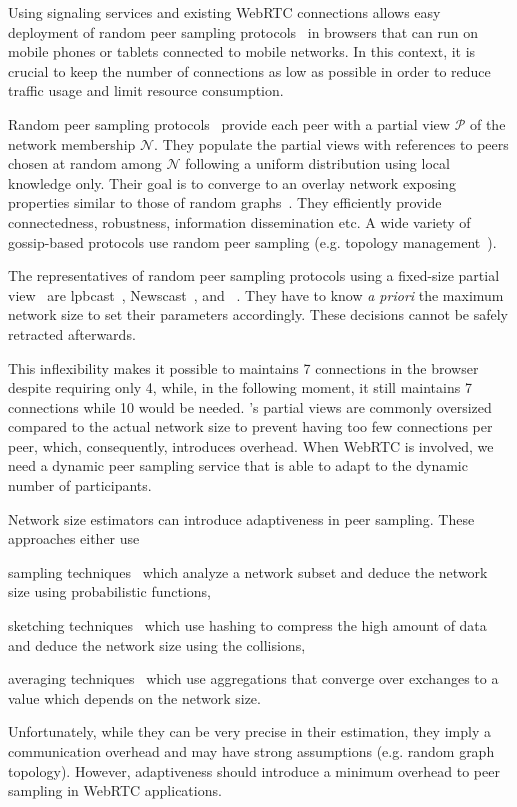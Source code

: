 Using signaling services and existing WebRTC connections allows easy
deployment of random peer sampling protocols~\cite{jelasity2004peer} in
browsers that can run on mobile phones or tablets connected to mobile
networks. In this context, it is crucial to keep the number of connections as
low as possible in order to reduce traffic usage and limit resource
consumption.

Random peer sampling protocols~\cite{jelasity2004peer, jelasity2007gossip} 
provide each
peer with a partial view $\mathcal{P}$ of the network membership
$\mathcal{N}$. They populate the partial views with references to
peers chosen at random among $\mathcal{N}$ following a uniform
distribution using local knowledge only. Their goal is to converge to
an overlay network exposing properties similar to those of random
graphs~\cite{erdos1959random}. They efficiently provide connectedness,
robustness, information dissemination etc. A wide variety of gossip-based
protocols use random peer sampling (e.g. topology
management~\cite{voulgaris2005epidemic, jelasity2009tman,
  dabek2004vivaldi}).

The representatives of random peer sampling protocols using a fixed-size
partial view~\cite{jelasity2007gossip} are
lpbcast~\cite{eugster2003lightweight}, Newscast~\cite{tolgyeski2009adaptive},
and \CYCLON~\cite{voulgaris2005cyclon}. They have to know \emph{a priori} the
maximum network size to set their parameters
accordingly. These decisions cannot be safely retracted afterwards.

This inflexibility makes it possible to maintains 7 connections in the browser
despite requiring only 4, while, in the following moment, it still maintains 7
connections while 10 would be needed.
\CYCLON's partial views are commonly oversized compared to the actual network
size to prevent having too few connections per peer,
which, consequently, introduces overhead.
When WebRTC is involved, we need a dynamic peer sampling
service that is able to adapt to the dynamic number of participants.

Network size estimators can introduce adaptiveness in peer sampling. These
approaches either use
\begin{inparaenum}[(i)]
\item sampling techniques~\cite{mane05network, ganesh2007peer,
    kostoulas2007active} which analyze a network subset and deduce the network
  size using probabilistic functions,
\item sketching techniques~\cite{flajolet2008hyperloglog, baquero2012extrema}
  which use hashing to compress the high amount of data and deduce the network
  size using the collisions,
\item averaging techniques~\cite{jelasity2004epidemic, blasa2011symmetric}
  which use aggregations that converge over exchanges to a value which depends
  on the network size.
\end{inparaenum}
Unfortunately, while they can be very precise in their estimation, they imply a
communication overhead and may have strong assumptions (e.g. random graph
topology). However, adaptiveness should introduce a minimum overhead
to peer sampling in WebRTC applications.

